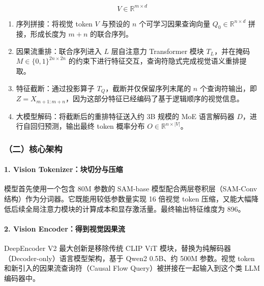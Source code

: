 \[
V\in\mathbb{R}^{m\times d}
\]

\begin{enumerate}
\def\labelenumi{\arabic{enumi}.}
\setcounter{enumi}{1}
\tightlist
\item
  序列拼接：将视觉 token \(V\) 与预设的 \(n\) 个可学习因果查询向量 \(Q_0\in\mathbb{R}^{n\times d}\) 拼接，形成长度为 \(m+n\) 的联合序列。
\item
  因果流重排：联合序列进入 \(L\) 层自注意力 Transformer 模块 \(T_L\)，并在掩码 \(M\in\{0,1\}^{2n\times2n}\) 的约束下进行特征交互，查询符隐式完成视觉语义重排提取。
\item
  特征截断：通过投影算子 \(T_Q\)，截断并仅保留序列末尾的 \(n\) 个查询符输出，即 \(Z=X_{m+1:m+n}\)，因为这部分特征已经编码了基于逻辑顺序的视觉信息。
\item
  大模型解码：将截断后的重排特征送入约 3B 规模的 MoE 语言解码器 \(D\)，进行自回归预测，输出最终 token 概率分布 \(O\in\mathbb{R}^{n\times |V|}\)。
\end{enumerate}

\hypertarget{ux4e8cux6838ux5fc3ux67b6ux6784-1}{%
\subsubsection{（二）核心架构}\label{ux4e8cux6838ux5fc3ux67b6ux6784-1}}

\hypertarget{vision-tokenizerux5757ux5207ux5206ux4e0eux538bux7f29}{%
\paragraph{1. Vision Tokenizer：块切分与压缩}\label{vision-tokenizerux5757ux5207ux5206ux4e0eux538bux7f29}}

模型首先使用一个包含 80M 参数的 SAM-base 模型配合两层卷积层（SAM-Conv 结构）作为分词器。它既能用较低参数量实现 16 倍视觉 token 压缩，又能大幅降低后续全局注意力模块的计算成本和显存激活量。最终输出特征维度为 896。

\hypertarget{vision-encoderux5f97ux5230ux89c6ux89c9ux56e0ux679cux6d41}{%
\paragraph{2. Vision Encoder：得到视觉因果流}\label{vision-encoderux5f97ux5230ux89c6ux89c9ux56e0ux679cux6d41}}

DeepEncoder V2 最大创新是移除传统 CLIP ViT 模块，替换为纯解码器（Decoder-only）语言模型架构，基于 Qwen2 0.5B、约 500M 参数。视觉 token 和新引入的因果流查询符（Causal Flow Query）被拼接在一起输入到这个类 LLM 编码器中。

